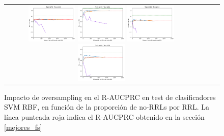 \begin{figure}[h!]
\begin{tabular}{cccc}
\includegraphics[width=0.25\textwidth]{Kap7/UNIFIED_train=b278_test=b234_rbf_curves.png}  \includegraphics[width=0.25\textwidth]{Kap7/UNIFIED_train=b278_test=b261_rbf_curves.png} 
 \includegraphics[width=0.25\textwidth]{Kap7/UNIFIED_train=b360_test=b234_rbf_curves.png}  \includegraphics[width=0.25\textwidth]{Kap7/UNIFIED_train=b360_test=b278_rbf_curves.png} 
\end{tabular}
\caption{Impacto de oversampling en el R-AUCPRC en test de clasificadores SVM RBF, en función de la proporción de no-RRLs por RRL. La línea punteada roja indica el R-AUCPRC obtenido en la sección \protect\ref{mejores_fs}}
\label{fig:svmk_oversampling}
\end{figure}

